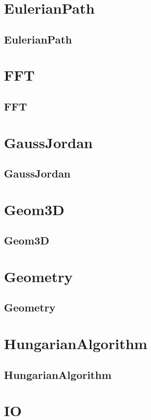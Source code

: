 \documentclass[a4paper, twocolumn]{article}
\begin{document}
\section{EulerianPath}
\subsection{EulerianPath}

\section{FFT}
\subsection{FFT}

\section{GaussJordan}
\subsection{GaussJordan}

\section{Geom3D}
\subsection{Geom3D}

\section{Geometry}
\subsection{Geometry}

\section{HungarianAlgorithm}
\subsection{HungarianAlgorithm}

\section{IO}
\end{document}
